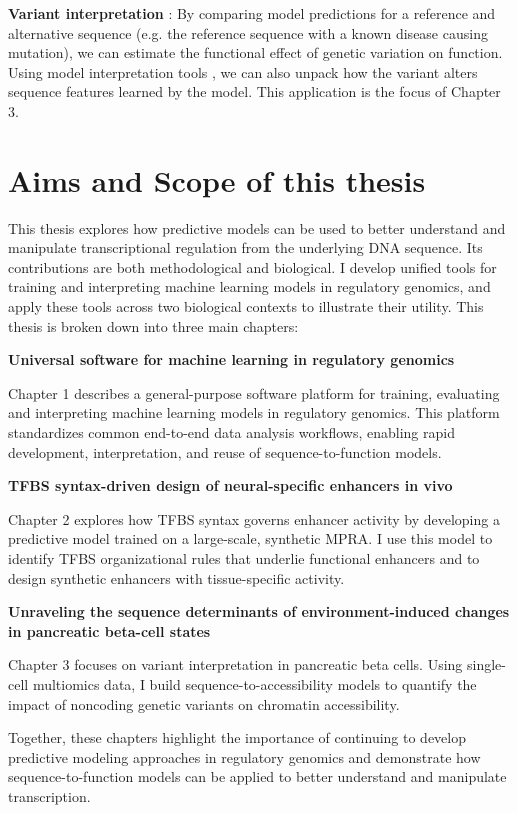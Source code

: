 \begin{dissertationintroduction}
\textbf{Variant interpretation} \cite{Dey2020-lf}: By comparing model predictions for a reference and alternative sequence (e.g. the reference sequence with a known disease causing mutation), we can estimate the functional effect of genetic variation on function. Using model interpretation tools \cite{Shrikumar2017-og}, we can also unpack how the variant alters sequence features learned by the model. This application is the focus of Chapter 3.

\section{Aims and Scope of this thesis}

This thesis explores how predictive models can be used to better understand and manipulate transcriptional regulation from the underlying DNA sequence. Its contributions are both methodological and biological. I develop unified tools for training and interpreting machine learning models in regulatory genomics, and apply these tools across two biological contexts to illustrate their utility. This thesis is broken down into three main chapters:

\textbf{Universal software for machine learning in regulatory genomics}

Chapter 1 describes a general-purpose software platform for training, evaluating and interpreting machine learning models in regulatory genomics. This platform standardizes common end-to-end data analysis workflows, enabling rapid development, interpretation, and reuse of sequence-to-function models.

\textbf{TFBS syntax-driven design of neural-specific enhancers in vivo}

Chapter 2 explores how TFBS syntax governs enhancer activity by developing a predictive model trained on a large-scale, synthetic MPRA. I use this model to identify TFBS organizational rules that underlie functional enhancers and to design synthetic enhancers with tissue-specific activity.

\textbf{Unraveling the sequence determinants of environment-induced changes in pancreatic beta-cell states}

Chapter 3 focuses on variant interpretation in pancreatic beta cells. Using single-cell multiomics data, I build sequence-to-accessibility models to quantify the impact of noncoding genetic variants on chromatin accessibility.

Together, these chapters highlight the importance of continuing to develop predictive modeling approaches in regulatory genomics and demonstrate how sequence-to-function models can be applied to better understand and manipulate transcription.

\end{dissertationintroduction}
